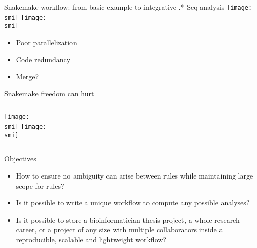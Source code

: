 \documentclass[10pt]{beamer}
\def\smi{out/ln/updir/mw-gcthesis-oral/library.bib}
\begin{document}
\begin{frame}{Snakemake workflow: from basic example to integrative .*-Seq analysis}
  \def\smi{out/ln/updir/mw-gcthesis-oral/ink/snakemake/rna-seq-star-deseq2.png}
  \texttt{[image: \\smi]}%
  \def\smi{out/ln/updir/mw-gcthesis-oral/ink/snakemake/snakechunk.png}
  \texttt{[image: \\smi]}
  {\small
  \begin{multicols}{3}
    \begin{itemize}
      \item Poor parallelization
      \item Code redundancy
      \item Merge?
    \end{itemize}
  \end{multicols}
  }
\end{frame}
\begin{frame}{Snakemake freedom can hurt}
  \begin{columns}
    \def\smi{out/ln/updir/mw-gcthesis-oral/ink/snakemake/ambiguous_rules.pdf}
    \texttt{[image: \\smi]}%
    \def\smi{out/ln/updir/mw-gcthesis-oral/ink/snakemake/venn_snakemake_output.pdf}
    \texttt{[image: \\smi]}%
  \end{columns}
\end{frame}
\begin{frame}{Objectives}
  \begin{itemize}
    \item How to ensure no ambiguity can arise between rules while maintaining large scope for rules?
    \item Is it possible to write a unique workflow to compute any possible analyses?
    \item Is it possible to store a bioinformatician thesis project, a whole research career, or a project of any size with multiple collaborators inside a reproducible, scalable and lightweight workflow?
  \end{itemize}
\end{frame}
\end{document}
